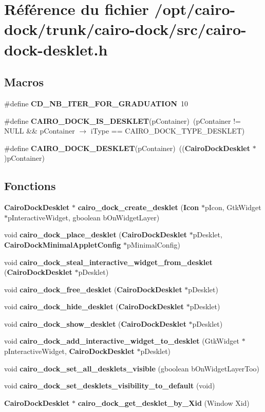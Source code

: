\section{Référence du fichier /opt/cairo-dock/trunk/cairo-dock/src/cairo-dock-desklet.h}
\label{cairo-dock-desklet_8h}
\subsection*{Macros}
\begin{CompactItemize}
\item 
\#define {\bf CD\_\-NB\_\-ITER\_\-FOR\_\-GRADUATION}~10
\item 
\#define {\bf CAIRO\_\-DOCK\_\-IS\_\-DESKLET}(pContainer)~(pContainer != NULL \&\& pContainer $\rightarrow$ iType == CAIRO\_\-DOCK\_\-TYPE\_\-DESKLET)
\item 
\#define {\bf CAIRO\_\-DOCK\_\-DESKLET}(pContainer)~(({\bf CairoDockDesklet} $\ast$)pContainer)
\end{CompactItemize}
\subsection*{Fonctions}
\begin{CompactItemize}
\item 
{\bf CairoDockDesklet} $\ast$ {\bf cairo\_\-dock\_\-create\_\-desklet} ({\bf Icon} $\ast$pIcon, GtkWidget $\ast$pInteractiveWidget, gboolean bOnWidgetLayer)
\item 
void {\bf cairo\_\-dock\_\-place\_\-desklet} ({\bf CairoDockDesklet} $\ast$pDesklet, {\bf CairoDockMinimalAppletConfig} $\ast$pMinimalConfig)
\item 
void {\bf cairo\_\-dock\_\-steal\_\-interactive\_\-widget\_\-from\_\-desklet} ({\bf CairoDockDesklet} $\ast$pDesklet)
\item 
void {\bf cairo\_\-dock\_\-free\_\-desklet} ({\bf CairoDockDesklet} $\ast$pDesklet)
\item 
void {\bf cairo\_\-dock\_\-hide\_\-desklet} ({\bf CairoDockDesklet} $\ast$pDesklet)
\item 
void {\bf cairo\_\-dock\_\-show\_\-desklet} ({\bf CairoDockDesklet} $\ast$pDesklet)
\item 
void {\bf cairo\_\-dock\_\-add\_\-interactive\_\-widget\_\-to\_\-desklet} (GtkWidget $\ast$pInteractiveWidget, {\bf CairoDockDesklet} $\ast$pDesklet)
\item 
void {\bf cairo\_\-dock\_\-set\_\-all\_\-desklets\_\-visible} (gboolean bOnWidgetLayerToo)
\item 
void {\bf cairo\_\-dock\_\-set\_\-desklets\_\-visibility\_\-to\_\-default} (void)
\item 
{\bf CairoDockDesklet} $\ast$ {\bf cairo\_\-dock\_\-get\_\-desklet\_\-by\_\-Xid} (Window Xid)
\end{CompactItemize}


